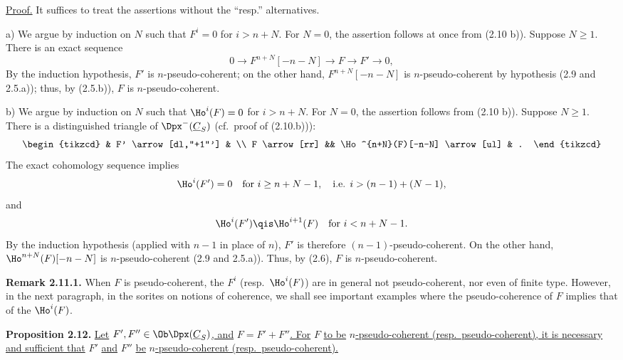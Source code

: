 \uline{Proof.} It suffices to treat the assertions without the ``resp.'' alternatives.

a) We argue by induction on \(N\) such that \(F^i=0\) for \(i>n+N\). For \(N=0\), the assertion follows at once from (2.10 b)). Suppose \(N\geq1\). There is an exact sequence
\[
  0\longrightarrow F^{n+N}[-n-N]\longrightarrow F\longrightarrow F'\longrightarrow 0,
\]
By the induction hypothesis, \(F'\) is \(n\)-pseudo-coherent; on the other hand, \(F^{n+N}[-n-N]\) is \(n\)-pseudo-coherent by hypothesis (2.9 and 2.5.a)); thus, by (2.5.b)), \(F\) is \(n\)-pseudo-coherent.

b) We argue by induction on \(N\) such that \(\Ho^i(F)=0\) for \(i>n+N\). For \(N=0\), the assertion follows from (2.10 b)). Suppose \(N\geq1\). There is a distinguished triangle of \(\Dpx^-(\underline{C}_S)\) (cf.\ proof of (2.10.b))):
\[
\begin{tikzcd}
& F' \arrow[dl,"+1"'] & \\
F \arrow[rr] && \Ho^{n+N}(F)[-n-N] \arrow[ul] & .
\end{tikzcd}
\]
The exact cohomology sequence implies
\[
  \Ho^i(F')=0\quad\text{for }i\geq n+N-1,\quad\text{i.e. }i>(n-1)+(N-1),
\]
and
\[
  \Ho^i(F')\qis\Ho^{i+1}(F)\quad\text{for }i<n+N-1 .
\]
%
By the induction hypothesis (applied with \(n-1\) in place of \(n\)), \(F'\) is therefore \((n-1)\)-pseudo-coherent. On the other hand, \(\Ho^{n+N}(F)[-n-N]\) is \(n\)-pseudo-coherent (2.9 and 2.5.a)). Thus, by (2.6), \(F\) is \(n\)-pseudo-coherent.

\textbf{Remark 2.11.1.} When \(F\) is pseudo-coherent, the \(F^i\) (resp.\ \(\Ho^i(F)\)) are in general not pseudo-coherent, nor even of finite type. However, in the next paragraph, in the sorites on notions of coherence, we shall see important examples where the pseudo-coherence of \(F\) implies that of the \(\Ho^i(F)\).

\textbf{Proposition 2.12.} \uline{Let} \(F',F''\in\Ob\Dpx(\underline{C}_S)\)\uline{, and} \(F=F'+F''\)\uline{. For} \(F\) \uline{to be} \(n\)\uline{-pseudo-coherent (resp.\ pseudo-coherent), it is necessary and sufficient that} \(F'\) \uline{and} \(F''\) \uline{be} \(n\)\uline{-pseudo-coherent (resp.\ pseudo-coherent).}


